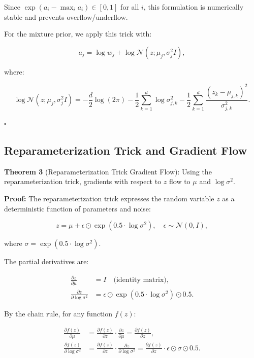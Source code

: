Since $\exp(a_i - \max_i a_i) \in [0, 1]$ for all $i$, this formulation is numerically stable and prevents overflow/underflow.

For the mixture prior, we apply this trick with:

\begin{equation}
a_j = \log w_j + \log \mathcal{N}(z; \mu_j, \sigma_j^2 I),
\end{equation}

where:

\begin{equation}
\log \mathcal{N}(z; \mu_j, \sigma_j^2 I) = -\frac{d}{2}\log(2\pi) - \frac{1}{2}\sum_{k=1}^{d} \log\sigma_{j,k}^2 - \frac{1}{2}\sum_{k=1}^{d} \frac{(z_k - \mu_{j,k})^2}{\sigma_{j,k}^2}.
\end{equation}

$\square$

\subsection{Reparameterization Trick and Gradient Flow}

\textbf{Theorem 3} (Reparameterization Trick Gradient Flow): Using the reparameterization trick, gradients with respect to $z$ flow to $\mu$ and $\log\sigma^2$.

\textbf{Proof:} The reparameterization trick expresses the random variable $z$ as a deterministic function of parameters and noise:

\begin{equation}
z = \mu + \epsilon \odot \exp(0.5 \cdot \log\sigma^2), \quad \epsilon \sim \mathcal{N}(0, I),
\end{equation}

where $\sigma = \exp(0.5 \cdot \log\sigma^2)$.

The partial derivatives are:

\begin{align}
\frac{\partial z}{\partial \mu} &= I \quad \text{(identity matrix)}, \\
\frac{\partial z}{\partial \log\sigma^2} &= \epsilon \odot \exp(0.5 \cdot \log\sigma^2) \odot 0.5.
\end{align}

By the chain rule, for any function $f(z)$:

\begin{align}
\frac{\partial f(z)}{\partial \mu} &= \frac{\partial f(z)}{\partial z} \cdot \frac{\partial z}{\partial \mu} = \frac{\partial f(z)}{\partial z}, \\
\frac{\partial f(z)}{\partial \log\sigma^2} &= \frac{\partial f(z)}{\partial z} \cdot \frac{\partial z}{\partial \log\sigma^2} = \frac{\partial f(z)}{\partial z} \cdot \epsilon \odot \sigma \odot 0.5.
\end{align}

